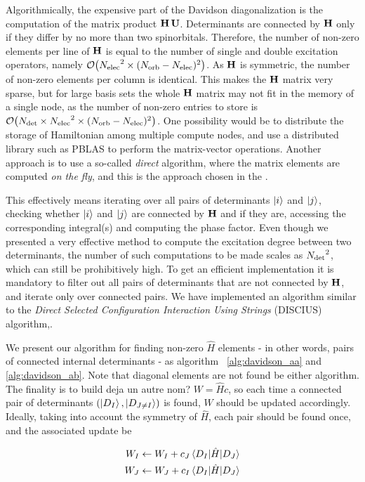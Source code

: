 \documentclass[./thesis.tex]{subfiles}
\begin{document}
    
Algorithmically, the expensive part of the Davidson diagonalization is the computation of the matrix product $\mathbf{H}\, \mathbf{U}$.
Determinants are connected by $\mathbf{H}$ only if they differ by no more than two
spinorbitals. Therefore, the number of non-zero elements per line of $\mathbf{H}$ is
equal to the number of single and double excitation operators, namely
$\order{\Nelec^2 \times (\Norb - \Nelec)^2}$. As $\mathbf{H}$ is symmetric, the number
of non-zero elements per column is identical. This makes the $\mathbf{H}$ matrix very
sparse, but for large basis sets the whole $\mathbf{H}$ matrix may not fit in the
memory of a single node, as the number of non-zero entries to store is
$\order{\Ndet \times \Nelec^2 \times (\Norb - \Nelec)^2}$.  One possibility
would be to distribute the storage of Hamiltonian among multiple compute nodes,
and use a distributed library such as PBLAS\cite{pblas} to perform the
matrix-vector operations. Another approach is to use a so-called \emph{direct}
algorithm, where the matrix elements are computed \emph{on the fly}, and this
is the approach chosen in the \QP.


This effectively means iterating over all pairs of determinants ${\ket{i}}$ and
${\ket{j}}$, checking whether ${\ket{i}}$ and ${\ket{j}}$ are connected by $\mathbf{H}$ and if they are,
accessing the corresponding integral(s) and computing the phase factor.  Even
though we presented a very effective method to compute the excitation degree
between two determinants, the number of such computations to be made scales as
${N_\text{det}}^2$, which can still be prohibitively high. To get an efficient
implementation it is mandatory to filter out all pairs of determinants that are
not connected by $\mathbf{H}$, and iterate only over connected pairs.  We have
implemented an algorithm similar to the \emph{Direct Selected Configuration
Interaction Using Strings} (DISCIUS) algorithm,\cite{Povill_1995}.

We present our algorithm for finding non-zero $\widehat{H}$ elements - in other words, pairs of connected internal determinants - as algorithm ~\ref{alg:davidson_aa} and \ref{alg:davidson_ab}. Note that diagonal elements are not found be either algorithm. The finality is to build \alert{deja un autre nom?} $W = \widehat{H} c$, so each time a connected pair of determinants $(\ket {D_I}, \ket {D_{J \neq I}})$ is found, $W$ should be updated accordingly. Ideally, taking into account the symmetry of $\widehat H$, each pair should be found once, and the associated update be

\begin{align}
W_I \gets W_I + c_J \mel{D_I}{\hat{H}}{D_J} \\
W_J \gets W_J + c_I \mel{D_I}{\hat{H}}{D_J}
\end{align}
\end{document}
